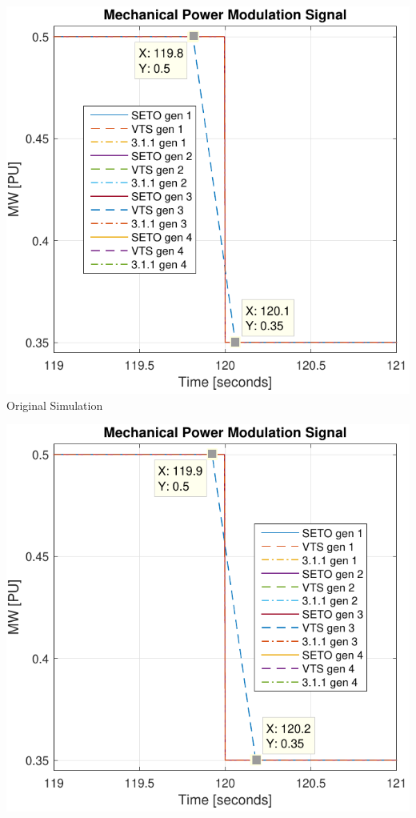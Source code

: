 \documentclass[12pt]{article}
\begin{document}
\begin{center}
\centering
\begin{minipage}{.3\linewidth}
\includegraphics[width=\linewidth]{pmSig_0}
\centering
Original Simulation
\end{minipage} %
\begin{minipage}{.3\linewidth}
\includegraphics[width=\linewidth]{pmSig_1}

\end{minipage}
\end{center}
\end{document}
